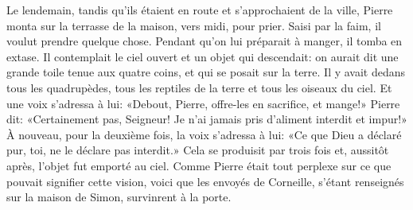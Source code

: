 Le lendemain, tandis qu’ils étaient en route et s’approchaient de la ville,
	Pierre monta sur la terrasse de la maison, vers midi, pour prier.
Saisi par la faim, il voulut prendre quelque chose.
	Pendant qu’on lui préparait à manger, il tomba en extase.
Il contemplait le ciel ouvert et un objet qui descendait:
	on aurait dit une grande toile tenue aux quatre coins,
	et qui se posait sur la terre.
Il y avait dedans tous les quadrupèdes,
	tous les reptiles de la terre et tous les oiseaux du ciel.
Et une voix s’adressa à lui:
	«Debout, Pierre, offre-les en sacrifice, et mange!»
Pierre dit: «Certainement pas, Seigneur!
	Je n’ai jamais pris d’aliment interdit et impur!»
À nouveau, pour la deuxième fois, la voix s’adressa à lui:
	«Ce que Dieu a déclaré pur, toi, ne le déclare pas interdit.»
Cela se produisit par trois fois
	et, aussitôt après, l’objet fut emporté au ciel.
Comme Pierre était tout perplexe sur ce que pouvait signifier cette vision,
	voici que les envoyés de Corneille, s’étant renseignés sur la maison de Simon,
	survinrent à la porte.
